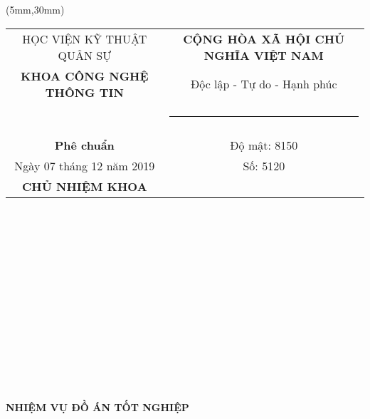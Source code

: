 \small
\begin{textblock*}{210mm}(5mm,30mm)
\begin{tabular}{cc}
	HỌC VIỆN KỸ THUẬT QUÂN SỰ  & \textbf{CỘNG HÒA XÃ HỘI CHỦ NGHĨA VIỆT NAM} \\
	\textbf{KHOA CÔNG NGHỆ THÔNG TIN}  & Độc lập - Tự do - Hạnh phúc \\
	& \rule{130px}{1px}\\
	& \\
	\large\textbf{Phê chuẩn} & \large Độ mật: 8150 \\
	\large Ngày 07 tháng 12 năm 2019 & \large Số: 5120 \\
	\textbf{CHỦ NHIỆM KHOA} & \\
\end{tabular}
\end{textblock*}

\textbf{}\\\\\\\\\\\\\\\\\\\\\\\\\\

\begin{center}
	\textbf{\large NHIỆM VỤ ĐỒ ÁN TỐT NGHIỆP}\\
\end{center}

\textbf{}\\\\

